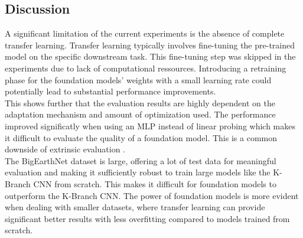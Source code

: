 \subsection{Discussion}

A significant limitation of the current experiments is the absence of complete transfer learning. Transfer learning typically involves fine-tuning the pre-trained model on the specific downstream task. This fine-tuning step was skipped in the experiments due to lack of computational ressources. Introducing a retraining phase for the foundation models' weights with a small learning rate could potentially lead to substantial performance improvements. \\
This shows further that the evaluation results are highly dependent on the adaptation mechanism and amount of optimization used. The performance improved significatly when using an MLP instead of linear probing which makes it difficult to evaluate the quality of a foundation model. This is a common downside of extrinsic evaluation \cite{foundationModels}. \\
The BigEarthNet dataset is large, offering a lot of test data for meaningful evaluation and making it sufficiently robust to train large models like the K-Branch CNN from scratch. This makes it difficult for foundation models to outperform the K-Branch CNN. The power of foundation models is more evident when dealing with smaller datasets, where transfer learning can provide significant better results with less overfitting compared to models trained from scratch.